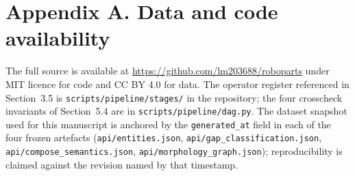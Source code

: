 \documentclass[11pt,twocolumn]{article}
\begin{document}
\section*{Appendix A. Data and code availability}

The full source is available at
\url{https://github.com/lm203688/roboparts} under MIT licence for
code and CC BY 4.0 for data. The operator register referenced in
Section~3.5 is \texttt{scripts/pipeline/stages/} in the repository;
the four crosscheck invariants of Section~5.4 are in
\texttt{scripts/pipeline/dag.py}. The dataset snapshot used for
this manuscript is anchored by the \texttt{generated\_at} field in
each of the four frozen artefacts (\texttt{api/entities.json},
\texttt{api/gap\_classification.json}, \texttt{api/compose\_semantics.json},
\texttt{api/morphology\_graph.json}); reproducibility is claimed
against the revision named by that timestamp.





\end{document}
